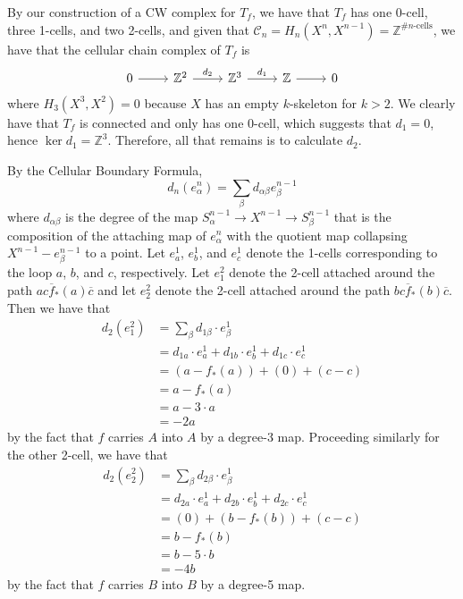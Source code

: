 \documentclass[twoside, titlepage]{amsart}
\makeatletter
\theoremstyle{plain} %
\theoremstyle{definition}
\theoremstyle{remark}
\theoremstyle{notation}
\renewenvironment{proof}[1][\proofname]{\par
	\pushQED{\qed}%
	\normalfont \topsep6\p@\@plus6\p@\relax
	\trivlist
	\item\relax
	{\itshape
		#1\@addpunct{.}}\hspace\labelsep\ignorespaces
}{%
\popQED\endtrivlist\@endpefalse
}
\newcommand{\inv}[1]{\overline{#1}}
\makeatother
\begin{document}
\begin{proof}
\begin{enumerate}[(a)]
			By our construction of a CW complex for $T_f$, we have that $T_f$ has one 0-cell, three 1-cells, and two 2-cells, and given that $\mathcal{C}_n = H_n(X^n, X^{n-1}) = \mathbb{Z}^{\text{\# } n \text{-cells}}$, we have that the cellular chain complex of $T_f$ is
			$$\begin{tikzcd}
			0 \arrow[r] & \mathbb{Z}^2 \arrow[r, "d_2"] & \mathbb{Z}^3 \arrow[r, "d_1"] & \mathbb{Z} \arrow[r] & 0
			\end{tikzcd}$$
			where $H_3(X^3,X^2) = 0$ because $X$ has an empty $k$-skeleton for $k > 2$.  We clearly have that $T_f$ is connected and only has one 0-cell, which suggests that $d_1 = 0$, hence $\ker d_1 = \mathbb{Z}^3$.  Therefore, all that remains is to calculate $d_2$.
			
			By the Cellular Boundary Formula,
			$$d_n(e_\alpha^n) = \sum_\beta d_{\alpha \beta} e_\beta^{n-1}$$
			where $d_{\alpha \beta}$ is the degree of the map $S_\alpha^{n-1} \to X^{n-1} \to S_\beta^{n-1}$ that is the composition of the attaching map of $e_\alpha^n$ with the quotient map collapsing $X^{n-1} - e_\beta^{n-1}$ to a point.  Let $e_a^1$, $e_b^1$, and $e_c^1$ denote the 1-cells corresponding to the loop $a$, $b$, and $c$, respectively.  Let $e_1^2$ denote the 2-cell attached around the path $a c \inv{f}_*(a) \inv{c}$ and let $e_2^2$ denote the 2-cell attached around the path $b c \inv{f}_*(b) \inv{c}$.  Then we have that
			\begin{align*}
			d_2(e_1^2) & = \sum_\beta d_{1 \beta} \cdot e_\beta^1 \\
			& = d_{1 a} \cdot e_a^1 + d_{1 b} \cdot e_b^1 + d_{1 c} \cdot e_c^1 \\
			& = (a - f_*(a)) + (0) + (c - c) \\
			& = a - f_*(a) \\
			& = a - 3 \cdot a \\
			& = -2 a
			\end{align*}
			by the fact that $f$ carries $A$ into $A$ by a degree-3 map.  Proceeding similarly for the other 2-cell, we have that
			\begin{align*}
			d_2(e_2^2) & = \sum_\beta d_{2 \beta} \cdot e_\beta^1 \\
			& = d_{2 a} \cdot e_a^1 + d_{2 b} \cdot e_b^1 + d_{2 c} \cdot e_c^1 \\
			& = (0) + (b - f_*(b)) + (c - c) \\
			& = b - f_*(b) \\
			& = b - 5 \cdot b \\
			& = -4 b
			\end{align*}
			by the fact that $f$ carries $B$ into $B$ by a degree-5 map.
			

\end{enumerate}
\end{proof}
\end{document}
